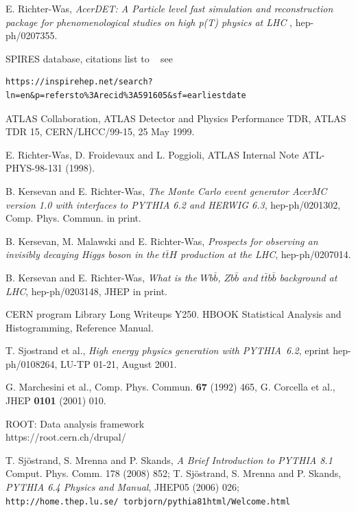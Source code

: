 \newpage
\begin{thebibliography}{}

 E. Richter-Was, {\it AcerDET: A Particle level fast simulation and reconstruction 
package for phenomenological studies on high p(T) physics at LHC },
hep-ph/0207355.

SPIRES database, citations list to ~\cite{AcerDET-1.0} see 
\begin{verbatim}  
https://inspirehep.net/search?ln=en&p=refersto%3Arecid%3A591605&sf=earliestdate
\end{verbatim}

ATLAS Collaboration, ATLAS Detector and Physics Performance TDR,
ATLAS TDR 15, CERN/LHCC/99-15, 25 May 1999.

E. Richter-Was, D. Froidevaux and L. Poggioli, ATLAS Internal Note 
 ATL-PHYS-98-131 (1998).

B. Kersevan and E. Richter-Was, {\it The Monte Carlo event generator 
AcerMC version 1.0 with interfaces to PYTHIA 6.2 and HERWIG 6.3},
hep-ph/0201302, Comp. Phys. Commun. in print.

B. Kersevan, M. Malawski and E. Richter-Was, {\it Prospects for
observing an invisibly decaying Higgs boson in the $t \bar t H$
production at the LHC}, hep-ph/0207014.

B. Kersevan and E. Richter-Was, {\it What is the $W b \bar b$, $Z b
\bar b$ and $t \bar t b \bar b$ background at LHC}, hep-ph/0203148, JHEP in print.

CERN program Library Long Writeups Y250. HBOOK Statistical Analysis
and Histogramming, Reference Manual.

T. Sjostrand et al., {\it High energy physics generation with PYTHIA~6.2},
eprint hep-ph/0108264, LU-TP  01-21, August 2001.

G. Marchesini et al., Comp. Phys. Commun. {\bf 67} (1992) 465,
G. Corcella et al., JHEP {\bf 0101} (2001) 010.

ROOT: Data analysis framework \\ https://root.cern.ch/drupal/

 T. Sjöstrand, S. Mrenna and P. Skands, {\it A Brief Introduction to PYTHIA 8.1} Comput. Phys. Comm. 178 (2008) 852;
T. Sjöstrand, S. Mrenna and P. Skands, {\it PYTHIA 6.4 Physics and Manual}, JHEP05 (2006) 026;\\
{\tt http://home.thep.lu.se/~torbjorn/pythia81html/Welcome.html}


\end{thebibliography}
